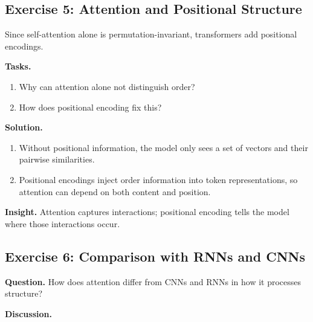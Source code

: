 \subsection{Exercise 5: Attention and Positional Structure}

Since self-attention alone is permutation-invariant, transformers add positional encodings.

\medskip

\noindent
\textbf{Tasks.}
\begin{enumerate}
    \item Why can attention alone not distinguish order?
    \item How does positional encoding fix this?
\end{enumerate}

\medskip

\noindent
\textbf{Solution.}

\begin{enumerate}
    \item Without positional information, the model only sees a set of vectors and their pairwise similarities.

    \item Positional encodings inject order information into token representations, so attention can depend on both content and position.
\end{enumerate}

\medskip

\noindent
\textbf{Insight.}  
Attention captures interactions; positional encoding tells the model where those interactions occur.

\subsection{Exercise 6: Comparison with RNNs and CNNs}

\textbf{Question.}  
How does attention differ from CNNs and RNNs in how it processes structure?

\medskip

\noindent
\textbf{Discussion.}

